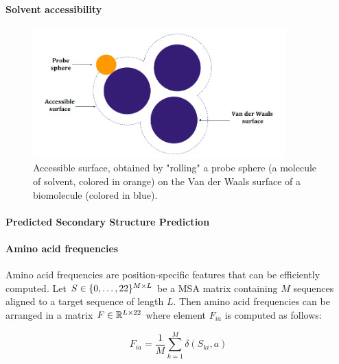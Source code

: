         \paragraph{Solvent accessibility}

            \todo{}

            \begin{figure}[H]
                \begin{center}
                    \includegraphics[height=5cm, keepaspectratio]{imgs/accessibility.png}
                    \caption{Accessible surface, obtained by "rolling" a probe sphere (a molecule
                        of solvent, colored in orange) on the Van der Waals surface of a biomolecule
                        (colored in blue).}
                    \label{architecture}
                \end{center}
            \end{figure}


        \paragraph{Predicted Secondary Structure Prediction}

        \paragraph{Amino acid frequencies}

            Amino acid frequencies are position-specific features that can be efficiently computed.
            Let $S \in \{0, \ldots, 22\}^{M \times L}$ be a 
            MSA matrix containing $M$ sequences aligned to a target
            sequence of length $L$. Then amino acid frequencies can be arranged
            in a matrix $F \in \mathbb{R}^{L \times 22}$
            where element $F_{ia}$ is computed as follows:

            \begin{equation}
                F_{ia} = \frac{1}{M} \sum\limits_{k=1}^M \delta(S_{ki}, a)
            \end{equation}

